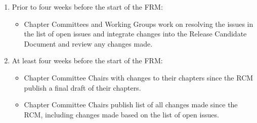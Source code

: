 {{\begin{enumerate}
\begin{enumerate}
  \item The ratification can be ``fast tracked'' if the following
    conditions are true:

    \begin{itemize}
    \item The first ballot on the Release Candidate Draft MPI Standard
      Document passed.
    \item  The list of still-unresolved issues is empty.
    \item The Forum resolved all other minor issues, such as
      formatting and whitespace problems, spelling errors, and other
      typos, and the MPI Standard Document Editor has produced a new
      Release Candidate Document containing all these fixes.
    \item After a new Release Candidate Document is available, the
      Forum decides, via special formal ballot, to ``fast track'' the
      ratification.  The ballot passes if:
      \begin{enumerate}
      \item The ballot meets the requirements for the individual
        ballot quorum, and
      \item There are zero ``no'' votes.
      \end{enumerate}
    \end{itemize}

    \item If all conditions are met, the ratification is fast tracked,
      steps 6 through 9b) are skipped, and step 9c) can be performed
      at the RCM.
  \end{enumerate}

\item Prior to four weeks before the start of the FRM:
  \begin{itemize}
  \item Chapter Committees and Working Groups work on resolving the
    issues in the list of open issues and integrate changes into the
    Release Candidate Document and review any changes made.
  \end{itemize}

\item At least four weeks before the start of the FRM:
  \begin{itemize}
  \item Chapter Committee Chairs with changes to their chapters since
    the RCM publish a final draft of their chapters.
  \item Chapter Committee Chairs publish list of all changes made
    since the RCM, including changes made based on the list of open
    issues.
  \end{itemize}


\end{enumerate}}}
